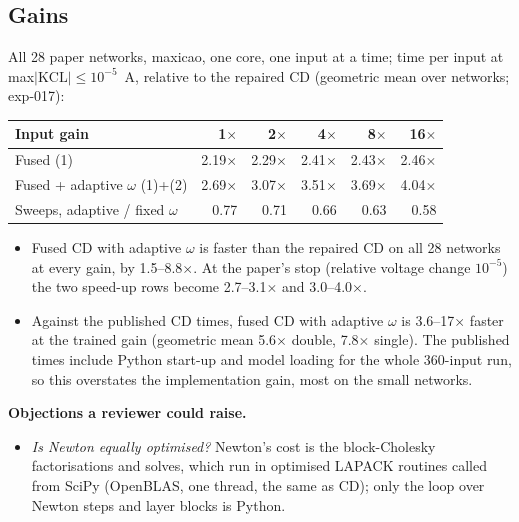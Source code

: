 \documentclass[11pt,a4paper]{article}
\newcommand{\objections}{\par\noindent\textbf{Objections a reviewer could raise.}\par}
\begin{document}
\subsection*{Gains}

All 28 paper networks, maxicao, one core, one input at a time; time per
input at max$|\mathrm{KCL}| \le 10^{-5}$~A, relative to the repaired CD
(geometric mean over networks; exp-017):

\begin{center}
\small
\begin{tabular}{lrrrrr}
\toprule
Input gain & 1$\times$ & 2$\times$ & 4$\times$ & 8$\times$ & 16$\times$ \\
\midrule
Fused (1)                         & 2.19$\times$ & 2.29$\times$ & 2.41$\times$ & 2.43$\times$ & 2.46$\times$ \\
Fused + adaptive $\omega$ (1)+(2) & 2.69$\times$ & 3.07$\times$ & 3.51$\times$ & 3.69$\times$ & 4.04$\times$ \\
\addlinespace
Sweeps, adaptive / fixed $\omega$ & 0.77 & 0.71 & 0.66 & 0.63 & 0.58 \\
\bottomrule
\end{tabular}
\end{center}

\begin{itemize}
\item Fused CD with adaptive $\omega$ is faster than the repaired CD on all
28 networks at every gain, by 1.5--8.8$\times$. At the paper's stop
(relative voltage change $10^{-5}$) the two speed-up rows become
2.7--3.1$\times$ and 3.0--4.0$\times$.
\item Against the published CD times, fused CD with adaptive $\omega$ is
3.6--17$\times$ faster at the trained gain (geometric mean 5.6$\times$
double, 7.8$\times$ single). The published times include Python start-up
and model loading for the whole 360-input run, so this overstates the
implementation gain, most on the small networks.
\end{itemize}

\objections
\begin{itemize}
\item \emph{Is Newton equally optimised?} Newton's cost is the
block-Cholesky factorisations and solves, which run in optimised LAPACK
routines called from SciPy (OpenBLAS, one thread, the same as CD); only
the loop over Newton steps and layer blocks is Python.
\end{itemize}
\end{document}
